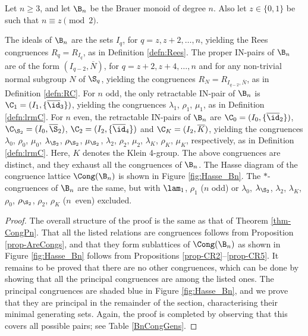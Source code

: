 \begin{thm}\label{CongBn}
Let $n\geq3$, and let $\B_n$ be the Brauer monoid of degree $n$.    Also let $z\in\{0,1\}$ be such that $n\equiv z\pmod{2}$.
\begin{itemize}
 The ideals of $\B_n$ are the sets $I_q$, for $q=z,z+2,\ldots,n$, yielding the Rees congruences $R_q=R_{I_q}$, as in Definition \ref{defn:Rees}.
 The proper IN-pairs of $\B_n$ are of the form $(I_{q-2},\overline N)$, for $q=z+2,z+4,\ldots,n$ and for any non-trivial normal subgroup $N$ of $\S_q$, yielding the congruences $R_N=R_{I_{q-2},\overline N}$, as in Definition \ref{defn:RC}.
 For $n$ odd, the only retractable IN-pair of $\B_n$ is $\C_1=(I_1,\{\overline\id_3\})$, yielding the congruences $\lambda_1$, $\rho_1$, $\mu_1$, as in Definition \ref{defn:lrmC}.
 For $n$ even, the retractable IN-pairs of $\B_n$ are $\C_0=(I_0,\{\overline{\id}_2\})$, $\C_{\S_2}=(I_0,\overline{\S}_2)$, $\C_2=(I_2,\{\overline{\id}_4\})$ and $\C_K=(I_2,\overline{K})$, yielding the congruences $\lambda_0$, $\rho_0$, $\mu_0$, $\lambda_{\S_2}$, $\rho_{\S_2}$, $\mu_{\S_2}$,
$\lambda_2$, $\rho_2$, $\mu_2$, $\lambda_K$, $\rho_K$, $\mu_K$, respectively, as in Definition \ref{defn:lrmC}.  Here, $K$ denotes the Klein 4-group.
 The above congruences are distinct, and they exhaust all the congruences of $\B_n$.
 The Hasse diagram of the congruence lattice $\Cong(\B_n) $ is shown in Figure \ref{fig:Hasse_Bn}.
 The $\ast$-congruences of $\B_n$ are the same, but with $\lam_1$, $\rho_1$ ($n$ odd) or $\lambda_0$, $\lambda_{\S_2}$, $\lambda_2$, $\lambda_K$, $\rho_0$, $\rho_{\S_2}$, $\rho_2$, $\rho_K$ ($n$~even) excluded.
\end{itemize}
\end{thm}

\begin{proof}
The overall structure of the proof is the same as that of Theorem \ref{thm-CongPn}.
That all the listed relations are congruences follows from Proposition \ref{prop-AreCongs}, and
that they form sublattices of $\Cong(\B_n)$ as shown in Figure \ref{fig:Hasse_Bn}
follows from Propositions \ref{prop-CR2}--\ref{prop-CR5}.
It remains to be proved that there are no other congruences, which can be done by showing that all the principal congruences are among the listed ones.
The principal congruences are shaded blue in Figure \ref{fig:Hasse_Bn}, 
and we prove that they are principal in the remainder of the section, characterising their minimal generating sets.
Again, the proof is completed by observing that this covers all possible pairs; see Table \ref{BnCongGens}.
\end{proof}

